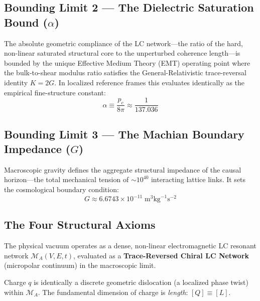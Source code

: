 \subsection*{Bounding Limit 2 --- The Dielectric Saturation Bound ($\alpha$)}

The absolute geometric compliance of the LC network---the ratio of the hard,
non-linear saturated structural core to the unperturbed coherence length---is
bounded by the unique Effective Medium Theory (EMT) operating point where
the bulk-to-shear modulus ratio satisfies the General-Relativistic
trace-reversal identity $K = 2G$. In localized reference frames this
evaluates identically as the empirical fine-structure constant:
\begin{equation}
    \alpha \equiv \frac{p_c}{8\pi}
    \approx \frac{1}{137.036}
    \label{eq:alpha_def}
\end{equation}

\subsection*{Bounding Limit 3 --- The Machian Boundary Impedance ($G$)}

Macroscopic gravity defines the aggregate structural impedance of the causal
horizon---the total mechanical tension of $\sim\!10^{40}$ interacting lattice
links. It sets the cosmological boundary condition:
\begin{equation}
    G \approx 6.6743 \times 10^{-11}\;\text{m}^3\text{kg}^{-1}\text{s}^{-2}
    \label{eq:G_input}
\end{equation}

\subsection*{The Four Structural Axioms}

\begin{axiom}
The physical vacuum operates as a dense, non-linear electromagnetic LC
resonant network $\mathcal{M}_A(V, E, t)$, evaluated as a
\textbf{Trace-Reversed Chiral LC Network} (micropolar continuum) in
the macroscopic limit.
\end{axiom}

\begin{axiom}
Charge $q$ is identically a discrete geometric dislocation (a localized phase
twist) within $\mathcal{M}_A$. The fundamental dimension of charge is
\textit{length}: $[Q] \equiv [L]$.
\end{axiom}

